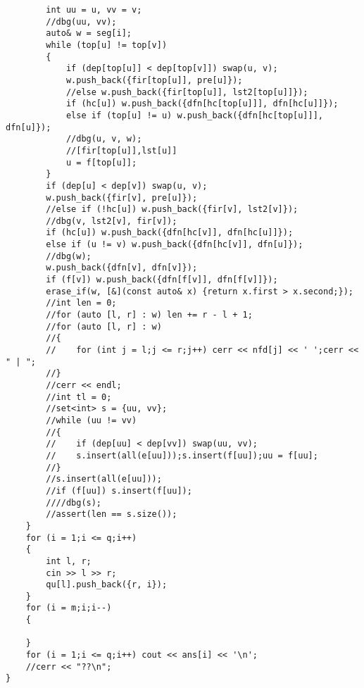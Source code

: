 \documentclass[12pt]{ctexart}
\begin{document}
\begin{lstlisting}
        int uu = u, vv = v;
        //dbg(uu, vv);
        auto& w = seg[i];
        while (top[u] != top[v])
        {
            if (dep[top[u]] < dep[top[v]]) swap(u, v);
            w.push_back({fir[top[u]], pre[u]});
            //else w.push_back({fir[top[u]], lst2[top[u]]});
            if (hc[u]) w.push_back({dfn[hc[top[u]]], dfn[hc[u]]});
            else if (top[u] != u) w.push_back({dfn[hc[top[u]]], dfn[u]});
            //dbg(u, v, w);
            //[fir[top[u]],lst[u]]
            u = f[top[u]];
        }
        if (dep[u] < dep[v]) swap(u, v);
        w.push_back({fir[v], pre[u]});
        //else if (!hc[u]) w.push_back({fir[v], lst2[v]});
        //dbg(v, lst2[v], fir[v]);
        if (hc[u]) w.push_back({dfn[hc[v]], dfn[hc[u]]});
        else if (u != v) w.push_back({dfn[hc[v]], dfn[u]});
        //dbg(w);
        w.push_back({dfn[v], dfn[v]});
        if (f[v]) w.push_back({dfn[f[v]], dfn[f[v]]});
        erase_if(w, [&](const auto& x) {return x.first > x.second;});
        //int len = 0;
        //for (auto [l, r] : w) len += r - l + 1;
        //for (auto [l, r] : w)
        //{
        //    for (int j = l;j <= r;j++) cerr << nfd[j] << ' ';cerr << " | ";
        //}
        //cerr << endl;
        //int tl = 0;
        //set<int> s = {uu, vv};
        //while (uu != vv)
        //{
        //    if (dep[uu] < dep[vv]) swap(uu, vv);
        //    s.insert(all(e[uu]));s.insert(f[uu]);uu = f[uu];
        //}
        //s.insert(all(e[uu]));
        //if (f[uu]) s.insert(f[uu]);
        ////dbg(s);
        //assert(len == s.size());
    }
    for (i = 1;i <= q;i++)
    {
        int l, r;
        cin >> l >> r;
        qu[l].push_back({r, i});
    }
    for (i = m;i;i--)
    {

    }
    for (i = 1;i <= q;i++) cout << ans[i] << '\n';
    //cerr << "??\n";
}

\end{lstlisting}
\end{document}
